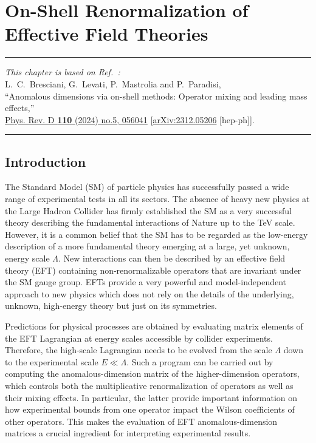 \chapter{On-Shell Renormalization of Effective Field Theories\label{ch:RGEmethod}}

\begin{flushright}
\small

{\color{chapterpaperrule}\rule{\textwidth}{0.5pt}}

\textit{This chapter is based on Ref.~\cite{Bresciani:2023jsu}:}\\[0.5em]
L.~C.~Bresciani, G.~Levati, P.~Mastrolia and P.~Paradisi,\\
``Anomalous dimensions via on-shell methods: Operator mixing and leading mass effects,''\\
\href{https://doi.org/10.1103/PhysRevD.110.056041}{Phys. Rev. D \textbf{110} (2024) no.5, 056041}
[\href{https://doi.org/10.48550/arXiv.2312.05206}{arXiv:2312.05206} [hep-ph]].

{\color{chapterpaperrule}\rule{\textwidth}{0.5pt}}
\end{flushright}

\section{Introduction}
The Standard Model (SM) of particle physics has successfully passed a wide range of experimental tests in all its sectors. The absence of heavy new physics at the Large Hadron Collider has firmly established the SM as a very
successful theory describing the fundamental interactions of Nature up to the TeV scale. However, it
is a common belief that the SM has to be regarded as the low-energy description of a more
fundamental theory emerging at a large, yet unknown, energy scale $\Lambda$. New interactions can
then be described by an effective field theory (EFT) containing non-renormalizable operators that are
invariant under the SM gauge group. EFTs provide a very powerful and model-independent approach to new physics
which does not rely on the details of the underlying, unknown, high-energy theory but just on its
symmetries.

Predictions for physical processes are obtained by evaluating matrix elements of the EFT Lagrangian
at energy scales accessible by collider experiments. Therefore, the high-scale Lagrangian needs to be
evolved from the scale $\Lambda$ down to the experimental scale $E \ll \Lambda$. Such a program can
be carried out by computing the anomalous-dimension matrix of the higher-dimension operators, which
controls both the multiplicative renormalization of operators as well as their mixing effects. In
particular, the latter provide important information on how experimental bounds from one operator
impact the Wilson coefficients of other operators. This makes the evaluation of EFT anomalous-dimension matrices a crucial ingredient for interpreting experimental results.

